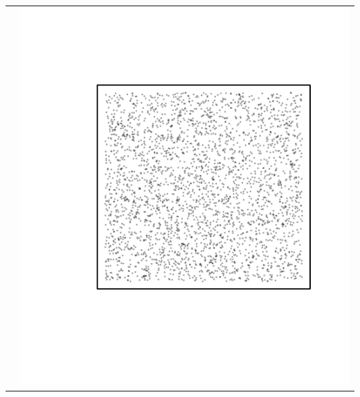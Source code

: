 \documentclass{article}\usepackage{graphicx, color}
\makeatletter
\def\maxwidth{ %
  \ifdim\Gin@nat@width>\linewidth
    \linewidth
  \else
    \Gin@nat@width
  \fi
}
\newenvironment{knitrout}{}{} %
\makeatother
\begin{document}
\begin{tabular}{cc}
&
\begin{knitrout}
\definecolor{shadecolor}{rgb}{0.969, 0.969, 0.969}\color{fgcolor}\includegraphics[width=\maxwidth]{figure/unnamed-chunk-24} 
\end{knitrout}

\\
\end{tabular}

\newpage
\end{document}
